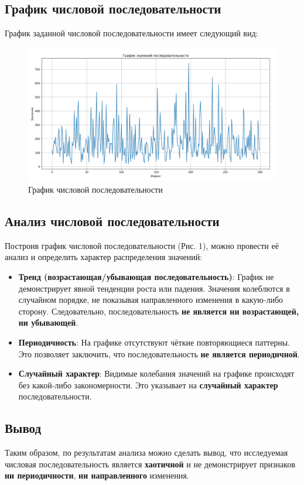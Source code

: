 \subsection{График числовой последовательности}
График заданной числовой последовательности имеет следующий вид:

\begin{figure}[H]
	\centering
	\includegraphics[width=1\textwidth]{../data/sequence.png}
	\caption{График числовой последовательности}
\end{figure}

\subsection{Анализ числовой последовательности}

Построив график числовой последовательности (Рис. 1), можно провести её анализ и определить характер распределения значений:

\begin{itemize}
	\item \textbf{Тренд (возрастающая/убывающая последовательность)}: График не демонстрирует явной тенденции роста или падения. Значения колеблются в случайном порядке, не показывая направленного изменения в какую-либо сторону. Следовательно, последовательность \textbf{не является ни возрастающей, ни убывающей}.

	\item \textbf{Периодичность}: На графике отсутствуют чёткие повторяющиеся паттерны. Это позволяет заключить, что последовательность \textbf{не является периодичной}.

	\item \textbf{Случайный характер}: Видимые колебания значений на графике происходят без какой-либо закономерности. Это указывает на \textbf{случайный характер} последовательности.
\end{itemize}

\subsection{Вывод}

Таким образом, по результатам анализа можно сделать вывод, что исследуемая числовая последовательность является \textbf{хаотичной} и не демонстрирует признаков \textbf{ни периодичности}, \textbf{ни направленного} изменения.
